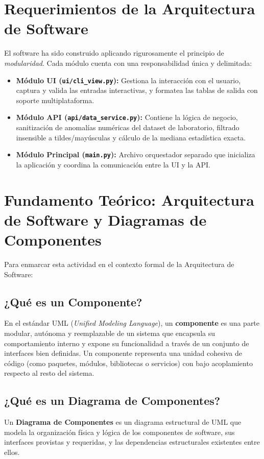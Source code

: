 \documentclass[12pt]{article}
\begin{document}
\section{Requerimientos de la Arquitectura de Software}

El software ha sido construido aplicando rigurosamente el principio de \textit{modularidad}. Cada módulo cuenta con una responsabilidad única y delimitada:

\begin{itemize}
    \item \textbf{Módulo UI (\texttt{ui/cli\_view.py}):} Gestiona la interacción con el usuario, captura y valida las entradas interactivas, y formatea las tablas de salida con soporte multiplataforma.
    \item \textbf{Módulo API (\texttt{api/data\_service.py}):} Contiene la lógica de negocio, sanitización de anomalías numéricas del dataset de laboratorio, filtrado insensible a tildes/mayúsculas y cálculo de la mediana estadística exacta.
    \item \textbf{Módulo Principal (\texttt{main.py}):} Archivo orquestador separado que inicializa la aplicación y coordina la comunicación entre la UI y la API.
\end{itemize}

\section{Fundamento Teórico: Arquitectura de Software y Diagramas de Componentes}

Para enmarcar esta actividad en el contexto formal de la Arquitectura de Software:

\subsection{¿Qué es un Componente?}
En el estándar UML (\textit{Unified Modeling Language}), un \textbf{componente} es una parte modular, autónoma y reemplazable de un sistema que encapsula su comportamiento interno y expone su funcionalidad a través de un conjunto de interfaces bien definidas. Un componente representa una unidad cohesiva de código (como paquetes, módulos, bibliotecas o servicios) con bajo acoplamiento respecto al resto del sistema.

\subsection{¿Qué es un Diagrama de Componentes?}
Un \textbf{Diagrama de Componentes} es un diagrama estructural de UML que modela la organización física y lógica de los componentes de software, sus interfaces provistas y requeridas, y las dependencias estructurales existentes entre ellos.
\end{document}
